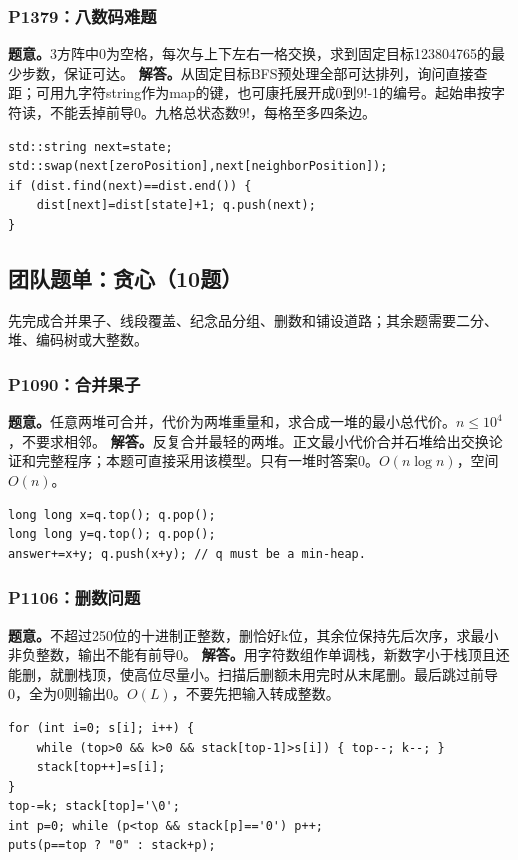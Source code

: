 \subsubsection{P1379：八数码难题}
\textbf{题意。}3方阵中0为空格，每次与上下左右一格交换，求到固定目标123804765的最少步数，保证可达。
\textbf{解答。}从固定目标BFS预处理全部可达排列，询问直接查距；可用九字符string作为map的键，也可康托展开成0到9!-1的编号。起始串按字符读，不能丢掉前导0。九格总状态数$9!$，每格至多四条边。
\begin{lstlisting}
std::string next=state;
std::swap(next[zeroPosition],next[neighborPosition]);
if (dist.find(next)==dist.end()) {
    dist[next]=dist[state]+1; q.push(next);
}
\end{lstlisting}

\subsection{团队题单：贪心（10题）}
先完成合并果子、线段覆盖、纪念品分组、删数和铺设道路；其余题需要二分、堆、编码树或大整数。

\subsubsection{P1090：合并果子}
\textbf{题意。}任意两堆可合并，代价为两堆重量和，求合成一堆的最小总代价。$n\le10^4$，不要求相邻。
\textbf{解答。}反复合并最轻的两堆。正文最小代价合并石堆给出交换论证和完整程序；本题可直接采用该模型。只有一堆时答案0。$O(n\log n)$，空间$O(n)$。
\begin{lstlisting}
long long x=q.top(); q.pop();
long long y=q.top(); q.pop();
answer+=x+y; q.push(x+y); // q must be a min-heap.
\end{lstlisting}

\subsubsection{P1106：删数问题}
\textbf{题意。}不超过250位的十进制正整数，删恰好k位，其余位保持先后次序，求最小非负整数，输出不能有前导0。
\textbf{解答。}用字符数组作单调栈，新数字小于栈顶且还能删，就删栈顶，使高位尽量小。扫描后删额未用完时从末尾删。最后跳过前导0，全为0则输出0。$O(L)$，不要先把输入转成整数。
\begin{lstlisting}
for (int i=0; s[i]; i++) {
    while (top>0 && k>0 && stack[top-1]>s[i]) { top--; k--; }
    stack[top++]=s[i];
}
top-=k; stack[top]='\0';
int p=0; while (p<top && stack[p]=='0') p++;
puts(p==top ? "0" : stack+p);
\end{lstlisting}

